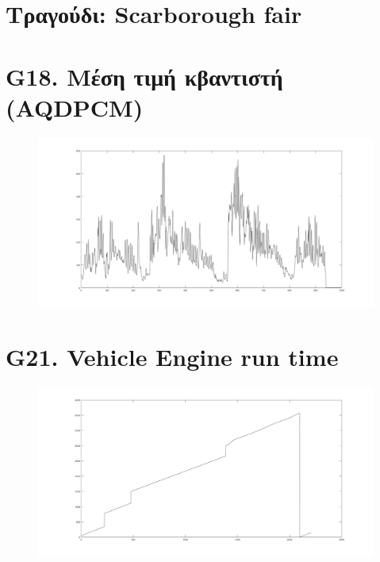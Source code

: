 \documentclass{article}
\begin{document}
\section*{Τραγούδι: Scarborough fair}
\section*{G18. Μέση τιμή κβαντιστή (AQDPCM) }
\begin{figure}[h!]
 \begin{center}
 \advance\leftskip-6cm
  \includegraphics[width=230mm,scale=0.7]{g18s2.jpg}
\end{center}
\end{figure}
\newpage
\section*{G21. Vehicle Engine run time }
\begin{figure}[h!]
 \begin{center}
 \advance\leftskip-6cm
  \includegraphics[width=230mm,scale=0.7]{g21s2.jpg}
\end{center}
\end{figure}
\newpage
\end{document}
